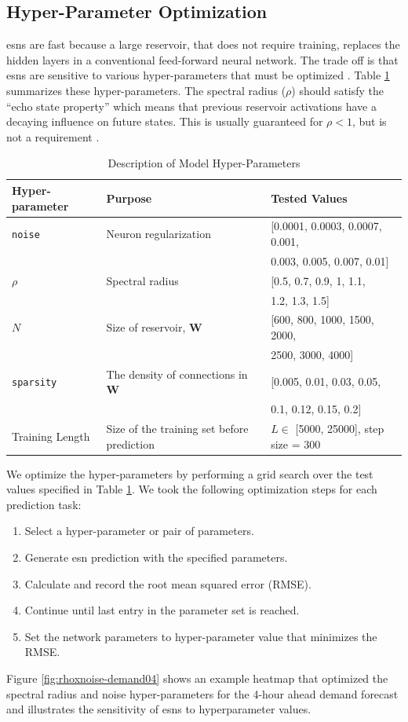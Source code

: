  \subsection{Hyper-Parameter Optimization}

 \glspl{esn} are fast because a large reservoir, that does not require
 training, replaces the hidden layers in a conventional feed-forward neural
 network.
 The trade off is that \glspl{esn} are sensitive to various hyper-parameters
 that must be optimized \cite{lukosevicius_practical_2012}. Table \ref{tab:parameters} summarizes these hyper-parameters. The spectral radius ($\rho$) should satisfy the ``echo state property'' which means that
 previous reservoir activations have a decaying influence on future states. This
 is usually guaranteed for $\rho < 1$, but is not a requirement
 \cite{lukosevicius_practical_2012}.
 \begin{table}[h]
   \centering
   \caption{Description of Model Hyper-Parameters}
   \begin{tabular}{l l l}
     \hline
     Hyper-parameter & Purpose & Tested Values\\
     \hline
     \texttt{noise} & Neuron regularization & [0.0001, 0.0003, 0.0007, 0.001, \\
     &&0.003, 0.005, 0.007, 0.01]\\
     $\rho$ & Spectral radius & [0.5, 0.7, 0.9, 1, 1.1, \\
     &&1.2, 1.3, 1.5]\\
     $N$ & Size of reservoir, \textbf{W} & [600, 800, 1000, 1500, 2000, \\
     &&2500, 3000, 4000]\\
     \texttt{sparsity} & The density of connections in \textbf{W}& [0.005, 0.01, 0.03, 0.05, \\
     &&0.1, 0.12, 0.15, 0.2]\\
     Training Length & Size of the training set before prediction & $L \in$ [5000, 25000], step size = 300\\
     \hline
   \end{tabular}
   \label{tab:parameters}
 \end{table}
\FloatBarrier
 We optimize the hyper-parameters by performing a grid search over the test
 values specified in Table \ref{tab:parameters}. We took the following
 optimization steps for each prediction task:
 \begin{enumerate}
   \item Select a hyper-parameter or pair of parameters.
   \item Generate \gls{esn} prediction with the specified parameters.
   \item Calculate and record the root mean squared error (RMSE).
   \item Continue until last entry in the parameter set is reached.
   \item Set the network parameters to hyper-parameter value that minimizes the
   RMSE.
 \end{enumerate}
 Figure \ref{fig:rhoxnoise-demand04} shows an example
 heatmap that optimized the spectral radius and noise hyper-parameters for the 4-hour
 ahead demand forecast and illustrates the sensitivity of \glspl{esn} to
 hyperparameter values.

